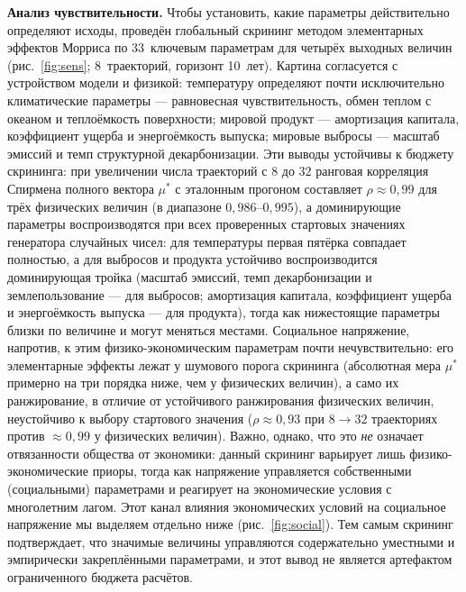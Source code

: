 \documentclass[11pt,a4paper]{article}
\begin{document}
\textbf{Анализ чувствительности.} Чтобы установить, какие параметры действительно определяют
исходы, проведён глобальный скрининг методом элементарных эффектов Морриса
\citep{morris1991,campolongo2007} по 33~ключевым параметрам для четырёх выходных
величин (рис.~\ref{fig:sens}; $8$~траекторий, горизонт 10~лет). Картина согласуется с
устройством модели и физикой: температуру определяют почти исключительно климатические
параметры --- равновесная чувствительность, обмен теплом с океаном и теплоёмкость
поверхности; мировой продукт --- амортизация капитала, коэффициент ущерба и энергоёмкость
выпуска; мировые выбросы --- масштаб эмиссий и темп структурной декарбонизации. Эти выводы
устойчивы к бюджету скрининга: при увеличении числа траекторий с $8$ до $32$ ранговая корреляция
Спирмена полного вектора $\mu^*$ с эталонным прогоном составляет $\rho\approx0{,}99$ для трёх
физических величин (в диапазоне $0{,}986$--$0{,}995$), а доминирующие параметры воспроизводятся при
всех проверенных стартовых значениях генератора случайных чисел: для температуры первая пятёрка
совпадает полностью, а для выбросов и продукта устойчиво воспроизводится доминирующая тройка
(масштаб эмиссий, темп декарбонизации и землепользование --- для выбросов; амортизация капитала,
коэффициент ущерба и энергоёмкость выпуска --- для продукта), тогда как нижестоящие параметры
близки по величине и могут меняться местами. Социальное напряжение, напротив, к этим физико-экономическим параметрам почти
нечувствительно: его элементарные эффекты лежат у шумового порога скрининга (абсолютная мера
$\mu^*$ примерно на три порядка ниже, чем у физических величин), а само их
ранжирование, в отличие от устойчивого ранжирования физических величин, неустойчиво к выбору
стартового значения ($\rho\approx0{,}93$ при $8\!\to\!32$ траекториях против $\approx0{,}99$ у
физических величин). Важно, однако, что это \emph{не} означает отвязанности общества от
экономики: данный скрининг варьирует лишь физико-экономические приоры, тогда как напряжение
управляется собственными (социальными) параметрами и реагирует на экономические условия с
многолетним лагом. Этот канал влияния экономических условий на социальное напряжение мы
выделяем отдельно ниже (рис.~\ref{fig:social}). Тем самым
скрининг подтверждает, что значимые величины управляются содержательно уместными и эмпирически
закреплёнными параметрами, и этот вывод не является артефактом ограниченного бюджета расчётов.
\end{document}
